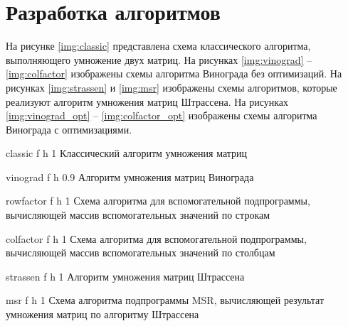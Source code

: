\section{Разработка алгоритмов}

На рисунке \ref{img:classic} представлена схема классического алгоритма, выполняющего умножение двух матриц. 
На рисунках \ref{img:vinograd} -- \ref{img:colfactor} изображены схемы алгоритма Винограда без оптимизаций. 
На рисунках \ref{img:strassen} и \ref{img:msr} изображены схемы алгоритмов, которые реализуют алгоритм умножения матриц Штрассена.  
На рисунках \ref{img:vinograd_opt} -- \ref{img:colfactor_opt} изображены схемы алгоритма Винограда с оптимизациями.

\clearpage

{classic} %
{f} %
{h} %
{1\textwidth} %
{Классический алгоритм умножения матриц} %


{vinograd} %
{f} %
{h} %
{0.9\textwidth} %
{Алгоритм умножения матриц Винограда} %

{rowfactor} %
{f} %
{h} %
{1\textwidth} %
{Схема алгоритма для вспомогательной подпрограммы, вычисляющей массив вспомогательных значений по строкам} %

{colfactor} %
{f} %
{h} %
{1\textwidth} %
{Схема алгоритма для вспомогательной подпрограммы, вычисляющей массив вспомогательных значений по столбцам} %

{strassen} %
{f} %
{h} %
{1\textwidth} %
{Алгоритм умножения матриц Штрассена} %

{msr} %
{f} %
{h} %
{1\textwidth} %
{Схема алгоритма подпрограммы MSR, вычисляющей результат умножения матриц по алгоритму Штрассена} %

